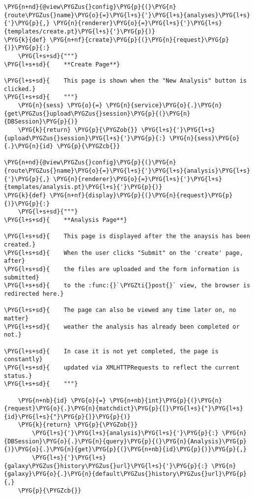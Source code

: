 \begin{Verbatim}[commandchars=\\\{\}]
\PYG{n+nd}{@view\PYGZus{}config}\PYG{p}{(}\PYG{n}{route\PYGZus{}name}\PYG{o}{=}\PYG{l+s}{'}\PYG{l+s}{analyses}\PYG{l+s}{'}\PYG{p}{,} \PYG{n}{renderer}\PYG{o}{=}\PYG{l+s}{'}\PYG{l+s}{templates/create.pt}\PYG{l+s}{'}\PYG{p}{)}
\PYG{k}{def} \PYG{n+nf}{create}\PYG{p}{(}\PYG{n}{request}\PYG{p}{)}\PYG{p}{:}
    \PYG{l+s+sd}{"""}
\PYG{l+s+sd}{    **Create Page**}

\PYG{l+s+sd}{    This page is shown when the "New Analysis" button is clicked.}
\PYG{l+s+sd}{    """}
    \PYG{n}{sess} \PYG{o}{=} \PYG{n}{service}\PYG{o}{.}\PYG{n}{get\PYGZus{}upload\PYGZus{}session}\PYG{p}{(}\PYG{n}{DBSession}\PYG{p}{)}
    \PYG{k}{return} \PYG{p}{\PYGZob{}} \PYG{l+s}{'}\PYG{l+s}{upload\PYGZus{}session}\PYG{l+s}{'}\PYG{p}{:} \PYG{n}{sess}\PYG{o}{.}\PYG{n}{id} \PYG{p}{\PYGZcb{}}

\PYG{n+nd}{@view\PYGZus{}config}\PYG{p}{(}\PYG{n}{route\PYGZus{}name}\PYG{o}{=}\PYG{l+s}{'}\PYG{l+s}{analysis}\PYG{l+s}{'}\PYG{p}{,} \PYG{n}{renderer}\PYG{o}{=}\PYG{l+s}{'}\PYG{l+s}{templates/analysis.pt}\PYG{l+s}{'}\PYG{p}{)}
\PYG{k}{def} \PYG{n+nf}{display}\PYG{p}{(}\PYG{n}{request}\PYG{p}{)}\PYG{p}{:}
    \PYG{l+s+sd}{"""}
\PYG{l+s+sd}{    **Analysis Page**}

\PYG{l+s+sd}{    This page is displayed after the the anaysis has been created.}
\PYG{l+s+sd}{    When the user clicks "Submit" on the 'create' page, after}
\PYG{l+s+sd}{    the files are uploaded and the form information is submitted}
\PYG{l+s+sd}{    to the :func:{}`\PYGZti{}post{}` view, the browser is redirected here.}

\PYG{l+s+sd}{    The page can also be viewed any time later on, no matter}
\PYG{l+s+sd}{    weather the analysis has already been completed or not.}

\PYG{l+s+sd}{    In case it is not yet completed, the page is constantly}
\PYG{l+s+sd}{    updated via XMLHTTPRequests to reflect the current status.}
\PYG{l+s+sd}{    """}
    
    \PYG{n+nb}{id} \PYG{o}{=} \PYG{n+nb}{int}\PYG{p}{(}\PYG{n}{request}\PYG{o}{.}\PYG{n}{matchdict}\PYG{p}{[}\PYG{l+s}{"}\PYG{l+s}{id}\PYG{l+s}{"}\PYG{p}{]}\PYG{p}{)}
    \PYG{k}{return} \PYG{p}{\PYGZob{}}
        \PYG{l+s}{'}\PYG{l+s}{analysis}\PYG{l+s}{'}\PYG{p}{:} \PYG{n}{DBSession}\PYG{o}{.}\PYG{n}{query}\PYG{p}{(}\PYG{n}{Analysis}\PYG{p}{)}\PYG{o}{.}\PYG{n}{get}\PYG{p}{(}\PYG{n+nb}{id}\PYG{p}{)}\PYG{p}{,}
        \PYG{l+s}{'}\PYG{l+s}{galaxy\PYGZus{}history\PYGZus{}url}\PYG{l+s}{'}\PYG{p}{:} \PYG{n}{galaxy}\PYG{o}{.}\PYG{n}{default\PYGZus{}history\PYGZus{}url}\PYG{p}{,}
    \PYG{p}{\PYGZcb{}}


\end{Verbatim}
